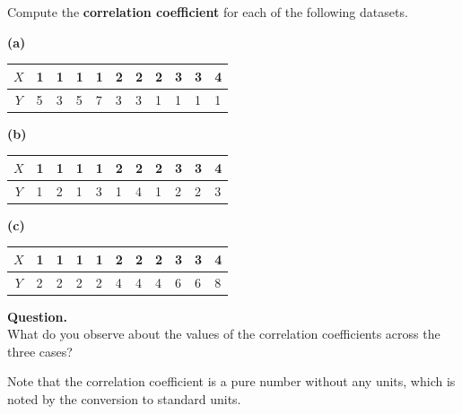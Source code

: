 \documentclass[
  letterpaper,
  DIV=11,
  numbers=noendperiod]{scrreprt}
\begin{document}
\begin{tcolorbox}[enhanced jigsaw, coltitle=black, colbacktitle=quarto-callout-tip-color!10!white, left=2mm, bottomrule=.15mm, bottomtitle=1mm, colback=white, titlerule=0mm, colframe=quarto-callout-tip-color-frame, breakable, leftrule=.75mm, toptitle=1mm, opacitybacktitle=0.6, rightrule=.15mm, title=\textcolor{quarto-callout-tip-color}{\faLightbulb}\hspace{0.5em}{Exercise: Correlation coefficients}, arc=.35mm, opacityback=0, toprule=.15mm]

Compute the \textbf{correlation coefficient} for each of the following
datasets.

\textbf{(a)}

\begin{longtable}[]{@{}cllllllllll@{}}
\toprule\noalign{}
\(X\) & 1 & 1 & 1 & 1 & 2 & 2 & 2 & 3 & 3 & 4 \\
\midrule\noalign{}
\endhead
\bottomrule\noalign{}
\endlastfoot
\(Y\) & 5 & 3 & 5 & 7 & 3 & 3 & 1 & 1 & 1 & 1 \\
\end{longtable}

\textbf{(b)}

\begin{longtable}[]{@{}cllllllllll@{}}
\toprule\noalign{}
\(X\) & 1 & 1 & 1 & 1 & 2 & 2 & 2 & 3 & 3 & 4 \\
\midrule\noalign{}
\endhead
\bottomrule\noalign{}
\endlastfoot
\(Y\) & 1 & 2 & 1 & 3 & 1 & 4 & 1 & 2 & 2 & 3 \\
\end{longtable}

\textbf{(c)}

\begin{longtable}[]{@{}cllllllllll@{}}
\toprule\noalign{}
\(X\) & 1 & 1 & 1 & 1 & 2 & 2 & 2 & 3 & 3 & 4 \\
\midrule\noalign{}
\endhead
\bottomrule\noalign{}
\endlastfoot
\(Y\) & 2 & 2 & 2 & 2 & 4 & 4 & 4 & 6 & 6 & 8 \\
\end{longtable}

\textbf{Question.}\\
What do you observe about the values of the correlation coefficients
across the three cases?

\end{tcolorbox}

Note that the correlation coefficient is a pure number without any
units, which is noted by the conversion to standard units.
\end{document}
